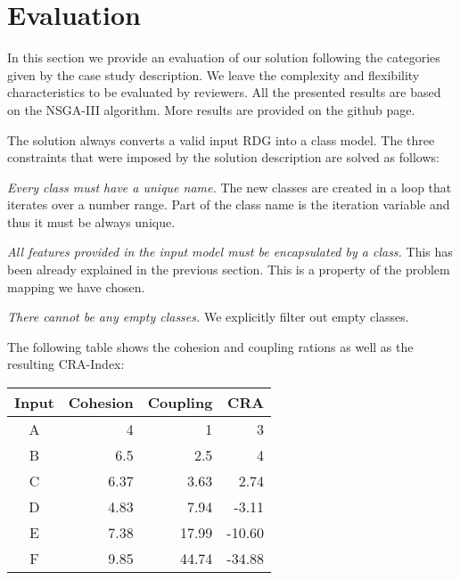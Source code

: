 
\section{Evaluation}
\label{sec:Evaluation}

In this section we provide an evaluation of our solution following the categories given by the case study description.
We leave the complexity and flexibility characteristics to be evaluated by reviewers.
All the presented results are based on the NSGA-III algorithm. 
More results are provided on the github page.

The solution always converts a valid input RDG into a class model.
The three constraints that were imposed by the solution description are solved as follows:
%
\begin{compactitem}[---]
  \item \emph{Every class must have a unique name.} 
  The new classes are created in a loop that iterates over a number range.
  Part of the class name is the iteration variable and thus it must be always unique.
  \item \emph{All features provided in the input model must be encapsulated by a class.} 
  This has been already explained in the previous section.
  This is a property of the problem mapping we have chosen.
  \item \emph{There cannot be any empty classes.}
  We explicitly filter out empty classes.
\end{compactitem}

The following table shows the cohesion and coupling rations as well as the resulting CRA-Index:
\begin{center}
\begin{tabular}{crrr}
\hline
\textbf{Input} & \textbf{Cohesion} & \textbf{Coupling} & \textbf{CRA} \\ \hline
A           & 4        & 1        & 3         \\
B           & 6.5      & 2.5      & 4         \\
C           & 6.37     & 3.63     & 2.74      \\
D           & 4.83     & 7.94     & -3.11     \\
E           & 7.38     & 17.99    & -10.60    \\
F           & 9.85     & 44.74    & -34.88    \\ \hline
\end{tabular}
\end{center}


